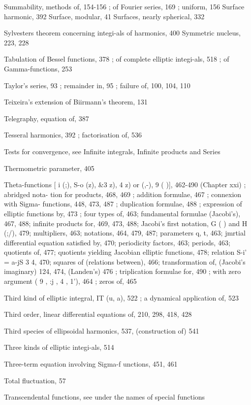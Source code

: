 Summability, methods of, 154-156 ; of Fourier series, 169 ; uniform, 156
Surface harmonic, 392
Surface, modular, 41
Surfaces, nearly spherical, 332

Sylvesters theorem concerning integi-als of harmonics, 400
Symmetric nucleus, 223, 228

Tabulation of Bessel functions, 378 ; of complete elliptic integi-als, 518 ; of Gamma-functions, 253

Taylor's series, 93 ; remainder in, 95 ; failure of, 100, 104, 110

Teixeira's extension of Biirmann's theorem, 131

Telegraphy, equation of, 387

Tesseral harmonics, 392 ; factorisation of, 536

Tests for convergence, see Infinite integrals, Infinite products and Series

Thermometric parameter, 405

Theta-functions [ i (;), S-o (z), \&3  z),  4  z) or   (,-), 9 ( )], 462-490 (Chapter xxi) ; abridged nota-
tion for products, 468, 469 ; addition formulae, 467 ; connexion with Sigma- functions, 448,
473, 487 ; duplication formulae, 488 ; expression of elliptic functions by, 473 ; four types
of, 463; fundamental formulae (Jacobi's), 467, 488; infinite products for, 469, 473, 488;
Jacobi's first notation, G ( ) and H (;/), 479; multipliers, 463; notations, 464, 479, 487;
parameters q, t, 463; jmrtial differential equation satisfied by, 470; periodicity factors,
463; periods, 463; quotients of, 477; quotients yielding Jacobian elliptic functions, 478;
relation S-i' = a-jS 3  4, 470; squares of (relations between), 466; transformation of, (Jacobi's
imaginary) 124, 474, (Landen's) 476 ; triplication formulae for, 490 ; with zero argument
( 9 ,  :j ,  4 ,  1'), 464 ; zeros of, 465

Third kind of elliptic integral, IT (u, a), 522 ; a dynamical application of, 523

Third order, linear differential equations of, 210, 298, 418, 428

Third species of ellipsoidal harmonics, 537, (construction of) 541

Three kinds of elliptic integi-als, 514

Three-term equation involving Sigma-f unctions, 451, 461

Total fluctuation, 57

Transcendental functions, see under the names of special functions

